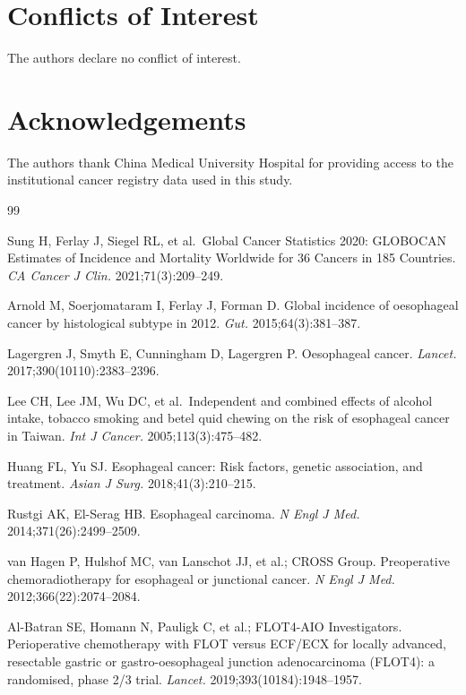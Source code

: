 \documentclass[12pt,a4paper]{article}
\begin{document}
\section*{Conflicts of Interest}
The authors declare no conflict of interest.

\section*{Acknowledgements}
The authors thank China Medical University Hospital for providing access
to the institutional cancer registry data used in this study.

\begin{thebibliography}{99}

Sung H, Ferlay J, Siegel RL, et al.\ Global Cancer Statistics 2020:
GLOBOCAN Estimates of Incidence and Mortality Worldwide for 36 Cancers
in 185 Countries. \textit{CA Cancer J Clin.} 2021;71(3):209--249.

Arnold M, Soerjomataram I, Ferlay J, Forman D. Global incidence of
oesophageal cancer by histological subtype in 2012.
\textit{Gut.} 2015;64(3):381--387.

Lagergren J, Smyth E, Cunningham D, Lagergren P. Oesophageal cancer.
\textit{Lancet.} 2017;390(10110):2383--2396.

Lee CH, Lee JM, Wu DC, et al.\ Independent and combined effects of
alcohol intake, tobacco smoking and betel quid chewing on the risk of
esophageal cancer in Taiwan.
\textit{Int J Cancer.} 2005;113(3):475--482.

Huang FL, Yu SJ. Esophageal cancer: Risk factors, genetic association,
and treatment. \textit{Asian J Surg.} 2018;41(3):210--215.

Rustgi AK, El-Serag HB. Esophageal carcinoma.
\textit{N Engl J Med.} 2014;371(26):2499--2509.

van Hagen P, Hulshof MC, van Lanschot JJ, et al.; CROSS Group.
Preoperative chemoradiotherapy for esophageal or junctional cancer.
\textit{N Engl J Med.} 2012;366(22):2074--2084.

Al-Batran SE, Homann N, Pauligk C, et al.; FLOT4-AIO Investigators.
Perioperative chemotherapy with FLOT versus ECF/ECX for locally advanced,
resectable gastric or gastro-oesophageal junction adenocarcinoma
(FLOT4): a randomised, phase 2/3 trial.
\textit{Lancet.} 2019;393(10184):1948--1957.


\end{thebibliography}
\end{document}
